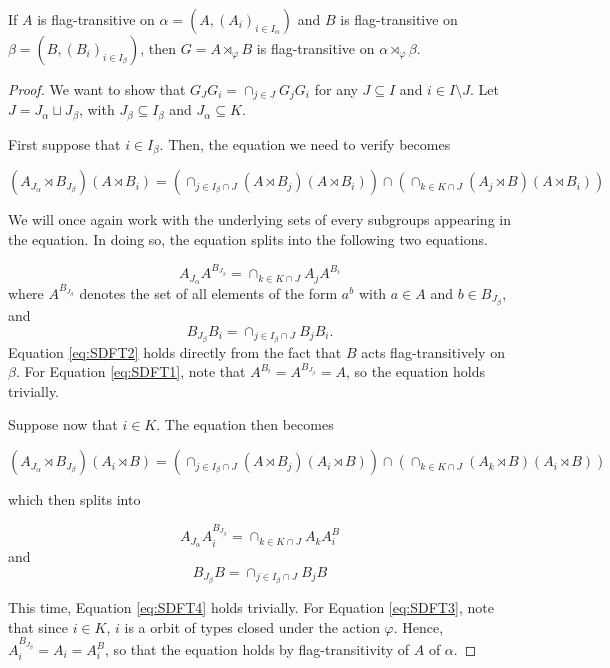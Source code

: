 \documentclass[10pt,a4paper]{amsart}
\begin{document}
\begin{prop}\label{prop:semidir_FT}
If $A$ is flag-transitive on $\alpha = (A,(A_i)_{i \in I_\alpha})$ and $B$ is flag-transitive on $\beta = (B,(B_i)_{i \in I_\beta})$, then $G = A \rtimes_\varphi B$ is flag-transitive on $\alpha \rtimes_\varphi \beta$.
\end{prop}

\begin{proof}
    We want to show that $G_JG_i = \cap_{j\in J} G_j G_i$ for any $J \subseteq I$ and $i\in I\setminus J$. Let $J = J_\alpha \sqcup J_\beta$, with $J_\beta \subseteq I_\beta$ and $J_\alpha \subseteq K$.
    
    First suppose that $i \in I_\beta$. Then, the equation we need to verify becomes

    $$ (A_{J_\alpha} \rtimes B_{J_\beta}) (A \rtimes B_i) = (\cap_{j \in I_\beta \cap J} (A \rtimes B_j) (A \rtimes B_i)) \cap ( \cap_{k \in K \cap J} (A_j \rtimes B) (A \rtimes B_i)) $$

    We will once again work with the underlying sets of every subgroups appearing in the equation. In doing so, the equation splits into the following two equations.
    
    \begin{equation}\label{eq:SDFT1}
          A_{J_\alpha} A^{B_{J_\beta}} =  \cap_{k \in K \cap J} A_j A^{B_i}
    \end{equation}
    where $A^{B_{J_\beta}}$ denotes the set of all elements of the form $a^{b}$ with $a \in A$ and $b \in B_{J_\beta}$,
    and 
  \begin{equation}\label{eq:SDFT2}
      B_{J_\beta}B_i = \cap_{j\in I_\beta \cap J} B_j B_i.
  \end{equation}
    Equation \ref{eq:SDFT2} holds directly from the fact that $B$ acts flag-transitively on $\beta$. For Equation \ref{eq:SDFT1}, note that $A^{B_i} = A^{B_{J_\beta}} = A$, so the equation holds trivially.

    Suppose now that $i \in K$. The equation then becomes

        $$ (A_{J_\alpha} \rtimes B_{J_\beta}) (A_i \rtimes B) = (\cap_{j \in I_\beta \cap J} (A \rtimes B_j) (A_i \rtimes B) )\cap (\cap_{k \in K \cap J} (A_k \rtimes B) (A_i \rtimes B))$$


which then splits into

\begin{equation}\label{eq:SDFT3}
          A_{J_\alpha} A_i^{B_{J_\beta}} =  \cap_{k \in K \cap J} A_k A_i^{B}
    \end{equation}
    and 
  \begin{equation}\label{eq:SDFT4}
      B_{J_\beta}B = \cap_{j\in I_\beta \cap J} B_j B
  \end{equation}

  This time, Equation \ref{eq:SDFT4} holds trivially. For Equation \ref{eq:SDFT3}, note that since $i\in K$, $i$ is a orbit of types closed under the action $\varphi$. Hence, $A_i^{B_{J_\beta}} = A_i =A_i^B$, so that the equation holds by flag-transitivity of $A$ of $\alpha$.

\end{proof}
\end{document}
